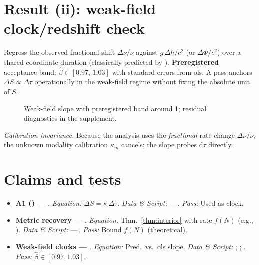 \documentclass[11pt,a4paper]{article}
\begin{document}
\section{Result (ii): weak-field clock/redshift check}
Regress the observed fractional shift $\Delta\nu/\nu$ against $g\,\Delta h/c^2$ (or $\Delta\Phi/c^2$) over a shared coordinate duration (classically predicted by \cite{Einstein1911}). \textbf{Preregistered} \gls{acceptance-band}: $\hat\beta\in[0.97,\,1.03]$ with standard errors from \gls{ols}. A pass anchors $\Delta S\propto\Delta\tau$ operationally in the \gls{weak-field} regime without fixing the absolute unit of $S$.%
\begin{figure}[H] %
  \centering
  \caption{Weak-field slope with preregistered band around 1; residual diagnostics in the supplement.}
\end{figure}

\noindent\emph{Calibration invariance.} Because the analysis uses the \emph{fractional} rate change $\Delta\nu/\nu$, the unknown modality calibration $\kappa_m$ cancels; the slope probes $\mathrm{d}\tau$ directly.


\section*{Claims and tests}
\begingroup\small\sloppy
\begin{itemize}
  \item \textbf{A1 (\EtLaw) — \Lzero}. \textit{Equation:} $\Delta S=\kappa\,\Delta\tau$. \textit{Data \& Script:} ---\,. \textit{Pass:} Used as clock.
  \item \textbf{Metric recovery — \Lthree}. \textit{Equation:} Thm.\ \ref{thm:interior} with rate $f(N)$ (e.g., \cite{Tenenbaum2000,lovasz1993random}). \textit{Data \& Script:} ---\,. \textit{Pass:} Bound $f(N)$ (theoretical).
  \item \textbf{Weak-field clocks — \Lthree}. \textit{Equation:} Pred.\ vs.\ \gls{ols} slope. \textit{Data \& Script:} ; ; . \textit{Pass:} $\hat\beta\!\in\![0.97,1.03]$.
\end{itemize}
\endgroup
\end{document}
